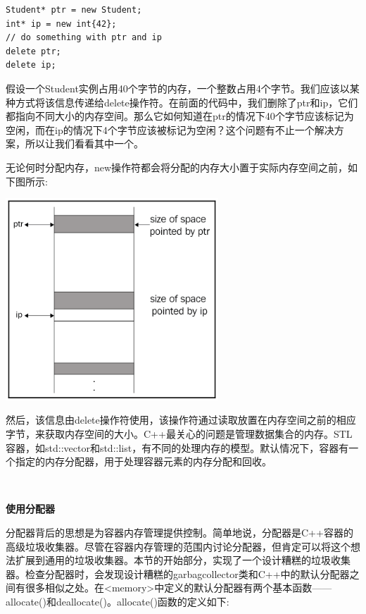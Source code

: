 \begin{lstlisting}[caption={}]
Student* ptr = new Student;
int* ip = new int{42};
// do something with ptr and ip
delete ptr;
delete ip;
\end{lstlisting}

假设一个Student实例占用40个字节的内存，一个整数占用4个字节。我们应该以某种方式将该信息传递给delete操作符。在前面的代码中，我们删除了ptr和ip，它们都指向不同大小的内存空间。那么它如何知道在ptr的情况下40个字节应该标记为空闲，而在ip的情况下4个字节应该被标记为空闲？这个问题有不止一个解决方案，所以让我们看看其中一个。\par
无论何时分配内存，new操作符都会将分配的内存大小置于实际内存空间之前，如下图所示: \par

\begin{center}
	\includegraphics[width=0.6\textwidth]{content/Section-1/Chapter-5/15}
\end{center}

然后，该信息由delete操作符使用，该操作符通过读取放置在内存空间之前的相应字节，来获取内存空间的大小。C++最关心的问题是管理数据集合的内存。STL容器，如std::vector和std::list，有不同的处理内存的模型。默认情况下，容器有一个指定的内存分配器，用于处理容器元素的内存分配和回收。 \par

\noindent\textbf{}\ \par
\textbf{使用分配器} \ \par
分配器背后的思想是为容器内存管理提供控制。简单地说，分配器是C++容器的高级垃圾收集器。尽管在容器内存管理的范围内讨论分配器，但肯定可以将这个想法扩展到通用的垃圾收集器。本节的开始部分，实现了一个设计糟糕的垃圾收集器。检查分配器时，会发现设计糟糕的garbagcollector类和C++中的默认分配器之间有很多相似之处。在<memory>中定义的默认分配器有两个基本函数——allocate()和deallocate()。allocate()函数的定义如下: \par

